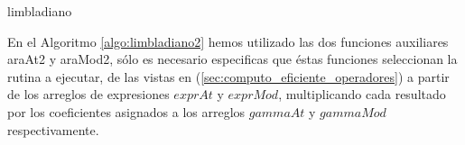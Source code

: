 \begin{algorithm}[H]
\caption{limbladiano}\label{algo:limbladiano2}
\LinesNumbered
{}
\end{algorithm}

\quad En el Algoritmo \ref{algo:limbladiano2} hemos utilizado las dos funciones auxiliares araAt2 y araMod2, s\'olo es necesario especificas que \'estas funciones seleccionan la rutina a ejecutar, de las vistas en (\ref{sec:computo_eficiente_operadores}) a partir de los arreglos de expresiones $exprAt$ y $exprMod$, multiplicando cada resultado por los coeficientes asignados a los arreglos $gammaAt$ y $gammaMod$ respectivamente.